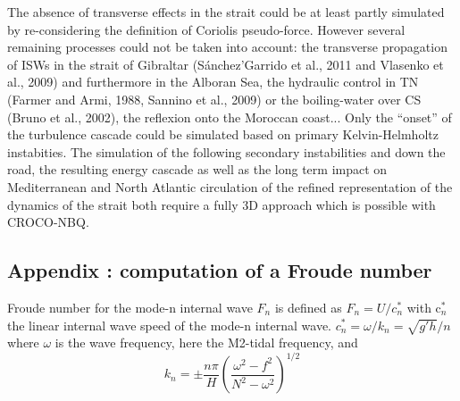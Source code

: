  The absence of transverse effects in the strait could be at least partly simulated by re-considering the definition of Coriolis pseudo-force. However several remaining processes could not be taken into account: the transverse propagation of ISWs in the strait of Gibraltar (S\'anchez'Garrido et al., 2011 and Vlasenko et al., 2009) and furthermore in the Alboran Sea, the hydraulic control in TN (Farmer and Armi, 1988, Sannino et al., 2009) or the boiling-water over CS (Bruno et al., 2002), the reflexion onto the Moroccan coast... Only the ``onset'' of the turbulence cascade could be simulated based on primary Kelvin-Helmholtz instabities. The simulation of the following secondary instabilities and down the road, the resulting energy cascade as well as the long term impact on Mediterranean and North Atlantic circulation of the refined representation of the dynamics of the strait both require a fully 3D approach which is possible with CROCO-NBQ. 
 


 \color{black}

\clearpage
\subsection{Appendix : computation of a Froude number}
Froude number for the mode-n internal wave $F_n$ is defined as $F_n=U/c^*_n$ with c$^*_n$ the linear internal wave speed of the mode-n internal wave.
 $c^*_n=\omega / k_n = \sqrt{g'h}/n$
 where $\omega$ is the wave frequency, here the M2-tidal frequency, and 
\begin{equation}
\label{eqK}
k_n=\pm \frac{n \pi}{H} \left( \frac{\omega^2 - f^2}{N^2 - \omega^2} \right) ^{1/2} 
\end{equation}

